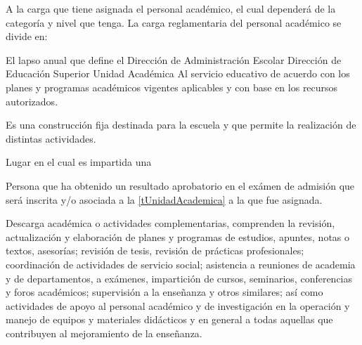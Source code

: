 \begin{bGlosario}
	  A la carga que tiene asignada el personal académico, el cual  dependerá de la categoría y nivel que tenga. La carga reglamentaria del personal académico se divide en: \\
	 	\begin{Titemize}
	 	\end{Titemize}
	  El lapso anual que define el 
	  Dirección de Administración Escolar
	  Dirección de Educación Superior
	  Unidad Académica
	  Al servicio educativo de acuerdo con los planes y programas académicos vigentes aplicables y con base en los recursos autorizados.
 
	 Es una construcción fija destinada para la escuela y que permite la realización de distintas actividades.
	
	 Lugar en el cual es impartida una 
	
	 Persona que ha obtenido un resultado aprobatorio en el exámen de admisión que será inscrita y/o asociada a la \ref{tUnidadAcademica} a la que fue asignada.

 	 Descarga académica o actividades complementarias, comprenden la revisión, actualización y elaboración de planes y programas de estudios, apuntes, notas o textos, asesorías; revisión de tesis, revisión de prácticas profesionales; coordinación de actividades de servicio social; asistencia a reuniones de academia y de departamentos, a exámenes, impartición de cursos, seminarios, conferencias y foros académicos; supervisión a la enseñanza y otros similares; así como actividades de apoyo al personal académico y de investigación en la operación y manejo de equipos y materiales didácticos y en general a todas aquellas que contribuyen al mejoramiento
 	de la enseñanza.
 	

\end{bGlosario}
